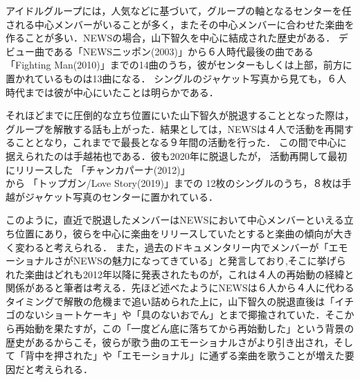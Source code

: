 アイドルグループには，人気などに基づいて，グループの軸となるセンターを任される中心メンバーがいることが多く，またその中心メンバーに合わせた楽曲を作ることが多い．NEWSの場合，山下智久を中心に結成された歴史がある．
デビュー曲である「NEWSニッポン(2003)」\cite{NEWSnippon}から６人時代最後の曲である「Fighting Man(2010)」\cite{FightingMan}までの14曲のうち，彼がセンターもしくは上部，前方に置かれているものは13曲になる．
シングルのジャケット写真から見ても，６人時代までは彼が中心にいたことは明らかである．


それほどまでに圧倒的な立ち位置にいた山下智久が脱退することとなった際は，グループを解散する話も上がった．結果としては，NEWSは４人で活動を再開することとなり，これまでで最長となる９年間の活動を行った．
この間で中心に据えられたのは手越祐也である．彼も2020年に脱退したが，
活動再開して最初にリリースした
「チャンカパーナ(2012)」\cite{Chankapana}から
「トップガン/Love Story(2019)」\cite{LoveStory}までの
12枚のシングルのうち，８枚は手越がジャケット写真のセンターに置かれている．


このように，直近で脱退したメンバーはNEWSにおいて中心メンバーといえる立ち位置にあり，彼らを中心に楽曲をリリースしていたとすると楽曲の傾向が大きく変わると考えられる．
また，過去のドキュメンタリー\cite{Ongaku}内でメンバーが「エモーショナルさがNEWSの魅力になってきている」と発言しており,そこに挙げられた楽曲はどれも2012年以降に発表されたものが，これは４人の再始動の経緯と関係があると筆者は考える．先ほど述べたようにNEWSは６人から４人に代わるタイミングで解散の危機まで追い詰められた上に，山下智久の脱退直後は「イチゴのないショートケーキ」や「具のないおでん」とまで揶揄されていた\cite{kysg}．そこから再始動を果たすが，この「一度どん底に落ちてから再始動した」という背景の歴史があるからこそ，彼らが歌う曲のエモーショナルさがより引き出され，そして「背中を押された」や「エモーショナル」に通ずる楽曲を歌うことが増えた要因だと考えられる．


